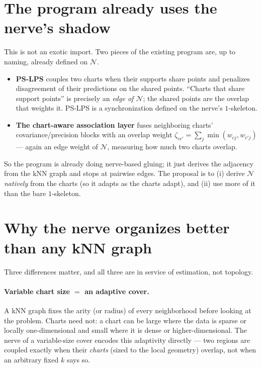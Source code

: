 \documentclass[11pt]{article}
\theoremstyle{definition}
\newcommand{\nerve}{\mathcal{N}}
\begin{document}
\section{The program already uses the nerve's shadow}\label{sec:shadow}

This is not an exotic import. Two pieces of the existing program are, up to
naming, already defined on $\nerve$.

\begin{itemize}[leftmargin=1.4em]
\item \textbf{PS-LPS} couples two charts when their supports share points and
penalizes disagreement of their predictions on the shared points. ``Charts that
share support points'' is precisely an \emph{edge of $\nerve$}; the shared points
are the overlap that weights it. PS-LPS is a synchronization defined on the nerve's
$1$-skeleton.
\item \textbf{The chart-aware association layer} fuses neighboring charts'
covariance/precision blocks with an overlap weight $\zeta_{cc'}=\sum_j\min(w_{cj},
w_{c'j})$ --- again an edge weight of $\nerve$, measuring how much two charts
overlap.
\end{itemize}

So the program is already doing nerve-based gluing; it just derives the adjacency
from the kNN graph and stops at pairwise edges. The proposal is to (i) derive
$\nerve$ \emph{natively} from the charts (so it adapts as the charts adapt), and
(ii) use more of it than the bare $1$-skeleton.

\section{Why the nerve organizes better than any kNN graph}\label{sec:why}

Three differences matter, and all three are in service of estimation, not topology.

\paragraph{Variable chart size $=$ an adaptive cover.} A kNN graph fixes the arity
(or radius) of every neighborhood before looking at the problem. Charts need not:
a chart can be large where the data is sparse or locally one-dimensional and small
where it is dense or higher-dimensional. The nerve of a variable-size cover encodes
this adaptivity directly --- two regions are coupled exactly when their
\emph{charts} (sized to the local geometry) overlap, not when an arbitrary fixed
$k$ says so.
\end{document}
